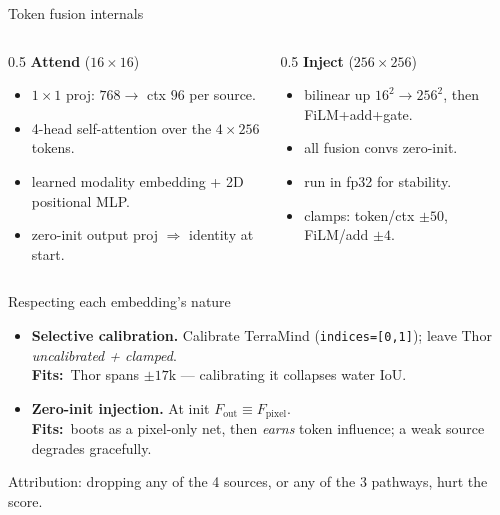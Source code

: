 \documentclass[aspectratio=169,11pt]{beamer}
\newcommand{\fit}{\textcolor{cHead}{\textbf{Fits:}}\ }
\newcommand{\code}[1]{\texttt{\small #1}}
\begin{document}
\begin{frame}{Token fusion internals}
  \begin{columns}[T]
    \begin{column}{0.5\textwidth}
      \textbf{Attend} ($16\times16$)
      \begin{itemize}\small
        \item $1{\times}1$ proj: $768\to$ ctx $96$ per source.
        \item 4-head self-attention over the $4\!\times\!256$ tokens.
        \item learned modality embedding + 2D positional MLP.
        \item \alert{zero-init} output proj $\Rightarrow$ identity at start.
      \end{itemize}
    \end{column}
    \begin{column}{0.5\textwidth}
      \textbf{Inject} ($256\times256$)
      \begin{itemize}\small
        \item bilinear up $16^2\to256^2$, then FiLM+add+gate.
        \item all fusion convs \alert{zero-init}.
        \item run in fp32 for stability.
        \item clamps: token/ctx $\pm50$, FiLM/add $\pm4$.
      \end{itemize}
    \end{column}
  \end{columns}
\end{frame}

\begin{frame}{Respecting each embedding's nature}
  \begin{itemize}
    \item \textbf{Selective calibration.} Calibrate TerraMind (\code{indices=[0,1]});
      leave Thor \emph{uncalibrated + clamped}.\\
      \fit Thor spans $\pm17$k --- calibrating it collapses water IoU.
    \item \textbf{Zero-init injection.} At init $F_{\text{out}}\!\equiv\!F_{\text{pixel}}$.\\
      \fit boots as a pixel-only net, then \emph{earns} token influence; a weak
      source degrades gracefully.
  \end{itemize}
  \vfill
  {\footnotesize Attribution: dropping any of the 4 sources, or any of the 3 pathways, hurt the score.}
\end{frame}
\end{document}

